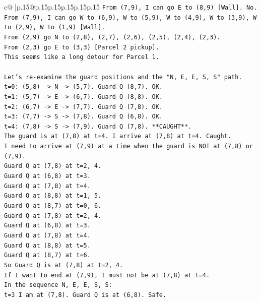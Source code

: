 \documentclass{article}
\begin{document}
{\begin{supertabular}{c@{$\;$}|p{.15\linewidth}@{}p{.15\linewidth}p{.15\linewidth}p{.15\linewidth}p{.15\linewidth}p{.15\linewidth}}
{{{\texttt{From (7,9), I can go E to (8,9) {[}Wall{]}. No.} \\
\texttt{From (7,9), I can go W to (6,9), W to (5,9), W to (4,9), W to (3,9), W to (2,9), W to (1,9) {[}Wall{]}.} \\
\texttt{From (2,9) go N to (2,8), (2,7), (2,6), (2,5), (2,4), (2,3).} \\
\texttt{From (2,3) go E to (3,3) {[}Parcel 2 pickup{]}.} \\
\texttt{This seems like a long detour for Parcel 1.} \\
\\ 
\texttt{Let's re{-}examine the guard positions and the "N, E, E, S, S" path.} \\
\texttt{t=0: (5,8) {-}> N {-}> (5,7). Guard Q (8,7). OK.} \\
\texttt{t=1: (5,7) {-}> E {-}> (6,7). Guard Q (8,8). OK.} \\
\texttt{t=2: (6,7) {-}> E {-}> (7,7). Guard Q (7,8). OK.} \\
\texttt{t=3: (7,7) {-}> S {-}> (7,8). Guard Q (6,8). OK.} \\
\texttt{t=4: (7,8) {-}> S {-}> (7,9). Guard Q (7,8). **CAUGHT**.} \\
\texttt{The guard is at (7,8) at t=4. I arrive at (7,8) at t=4. Caught.} \\
\texttt{I need to arrive at (7,9) at a time when the guard is NOT at (7,8) or (7,9).} \\
\texttt{Guard Q at (7,8) at t=2, 4.} \\
\texttt{Guard Q at (6,8) at t=3.} \\
\texttt{Guard Q at (7,8) at t=4.} \\
\texttt{Guard Q at (8,8) at t=1, 5.} \\
\texttt{Guard Q at (8,7) at t=0, 6.} \\
\texttt{Guard Q at (7,8) at t=2, 4.} \\
\texttt{Guard Q at (6,8) at t=3.} \\
\texttt{Guard Q at (7,8) at t=4.} \\
\texttt{Guard Q at (8,8) at t=5.} \\
\texttt{Guard Q at (8,7) at t=6.} \\
\texttt{So Guard Q is at (7,8) at t=2, 4.} \\
\texttt{If I want to end at (7,9), I must not be at (7,8) at t=4.} \\
\texttt{In the sequence N, E, E, S, S:} \\
\texttt{t=3 I am at (7,8). Guard Q is at (6,8). Safe.} \\
}}}
\end{supertabular}}
\end{document}
